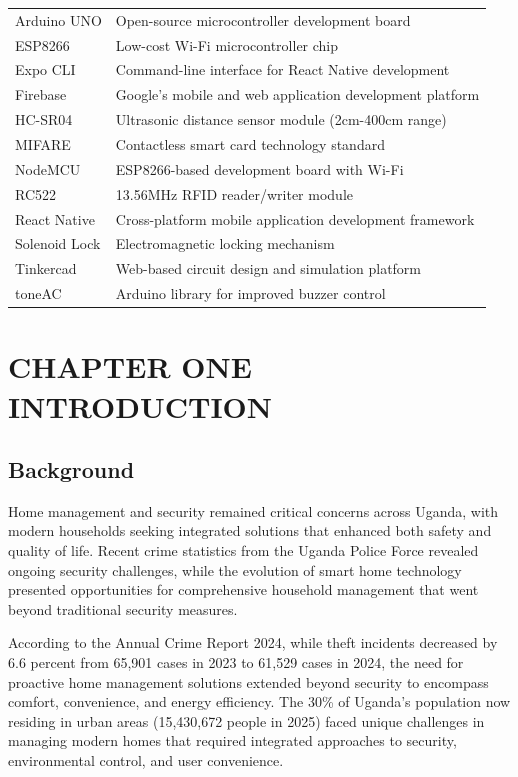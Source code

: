 \documentclass[12pt,a4paper]{report}
\begin{document}
\begin{tabular}{ll}
Arduino UNO & Open-source microcontroller development board \\
ESP8266 & Low-cost Wi-Fi microcontroller chip \\
Expo CLI & Command-line interface for React Native development \\
Firebase & Google's mobile and web application development platform \\
HC-SR04 & Ultrasonic distance sensor module (2cm-400cm range) \\
MIFARE & Contactless smart card technology standard \\
NodeMCU & ESP8266-based development board with Wi-Fi \\
RC522 & 13.56MHz RFID reader/writer module \\
React Native & Cross-platform mobile application development framework \\
Solenoid Lock & Electromagnetic locking mechanism \\
Tinkercad & Web-based circuit design and simulation platform \\
toneAC & Arduino library for improved buzzer control \\
\end{tabular}

\newpage

\setcounter{page}{1}

\chapter[CHAPTER ONE INTRODUCTION]{CHAPTER ONE\\INTRODUCTION}

\section{Background}

\noindent Home management and security remained critical concerns across Uganda, with modern households seeking integrated solutions that enhanced both safety and quality of life. Recent crime statistics from the Uganda Police Force revealed ongoing security challenges, while the evolution of smart home technology presented opportunities for comprehensive household management that went beyond traditional security measures.

\noindent According to the Annual Crime Report 2024, while theft incidents decreased by 6.6 percent from 65,901 cases in 2023 to 61,529 cases in 2024, the need for proactive home management solutions extended beyond security to encompass comfort, convenience, and energy efficiency. The 30\% of Uganda's population now residing in urban areas (15,430,672 people in 2025) faced unique challenges in managing modern homes that required integrated approaches to security, environmental control, and user convenience.
\end{document}
